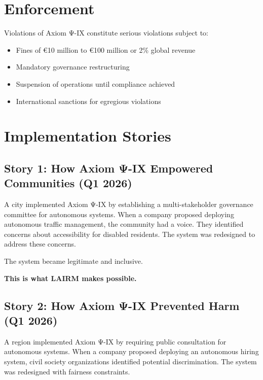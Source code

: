\vspace{0.5cm}

\section{Enforcement}

Violations of Axiom Ψ-IX constitute serious violations subject to:

\begin{itemize}
    \item Fines of €10 million to €100 million or 2\% global revenue
    \item Mandatory governance restructuring
    \item Suspension of operations until compliance achieved
    \item International sanctions for egregious violations
\end{itemize}

\vspace{0.5cm}

\section{Implementation Stories}

\subsection{Story 1: How Axiom Ψ-IX Empowered Communities (Q1 2026)}

A city implemented Axiom Ψ-IX by establishing a multi-stakeholder governance committee for autonomous systems. When a company proposed deploying autonomous traffic management, the community had a voice. They identified concerns about accessibility for disabled residents. The system was redesigned to address these concerns.

The system became legitimate and inclusive.

\textbf{This is what LAIRM makes possible.}

\subsection{Story 2: How Axiom Ψ-IX Prevented Harm (Q1 2026)}

A region implemented Axiom Ψ-IX by requiring public consultation for autonomous systems. When a company proposed deploying an autonomous hiring system, civil society organizations identified potential discrimination. The system was redesigned with fairness constraints.

